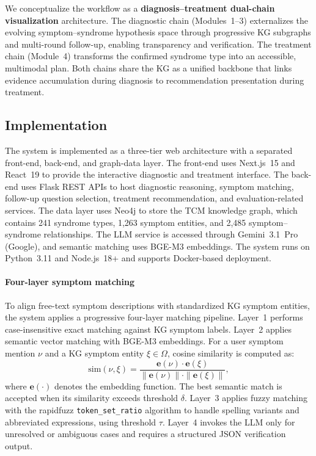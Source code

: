 We conceptualize the workflow as a \textbf{diagnosis--treatment dual-chain visualization} architecture. The diagnostic chain (Modules~1--3) externalizes the evolving symptom--syndrome hypothesis space through progressive KG subgraphs and multi-round follow-up, enabling transparency and verification. The treatment chain (Module~4) transforms the confirmed syndrome type into an accessible, multimodal plan. Both chains share the KG as a unified backbone that links evidence accumulation during diagnosis to recommendation presentation during treatment.

\subsection{Implementation}\label{sec:implementation}

The system is implemented as a three-tier web architecture with a separated front-end, back-end, and graph-data layer. The front-end uses Next.js~15 and React~19 to provide the interactive diagnostic and treatment interface. The back-end uses Flask REST APIs to host diagnostic reasoning, symptom matching, follow-up question selection, treatment recommendation, and evaluation-related services. The data layer uses Neo4j to store the TCM knowledge graph, which contains 241 syndrome types, 1,263 symptom entities, and 2,485 symptom--syndrome relationships. The LLM service is accessed through Gemini~3.1~Pro (Google), and semantic matching uses BGE-M3 embeddings. The system runs on Python~3.11 and Node.js~18+ and supports Docker-based deployment.

\paragraph{Four-layer symptom matching}
To align free-text symptom descriptions with standardized KG symptom entities, the system applies a progressive four-layer matching pipeline. Layer~1 performs case-insensitive exact matching against KG symptom labels. Layer~2 applies semantic vector matching with BGE-M3 embeddings. For a user symptom mention $\nu$ and a KG symptom entity $\xi \in \Omega$, cosine similarity is computed as:
\begin{equation}\label{eq:main-sim}
\mathrm{sim}(\nu, \xi) =
\frac{\mathbf{e}(\nu) \cdot \mathbf{e}(\xi)}
{\|\mathbf{e}(\nu)\| \cdot \|\mathbf{e}(\xi)\|},
\end{equation}
where $\mathbf{e}(\cdot)$ denotes the embedding function. The best semantic match is accepted when its similarity exceeds threshold $\delta$. Layer~3 applies fuzzy matching with the rapidfuzz \texttt{token\_set\_ratio} algorithm to handle spelling variants and abbreviated expressions, using threshold $\tau$. Layer~4 invokes the LLM only for unresolved or ambiguous cases and requires a structured JSON verification output.

